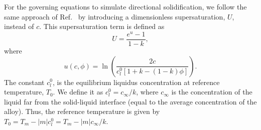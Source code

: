 \documentclass[10pt]{article}
\begin{document}
For the governing equations to simulate directional solidification, we follow the same approach of Ref.~\cite{Echebarria2004} by introducing a dimensionless supersaturation, $U$, instead of $c$. This supersaturation term is defined as
\begin{equation}
U = \frac{e^u -1}{1-k},
\end{equation}
where
\begin{equation}
\label{defu}
u(c,\phi) = \ln \left( \frac{2c}{c_l^0[1+k-(1-k)\phi]}\right).
\end{equation}
The constant $c_l^0$, is the equilibrium liquidus concentration at reference temperature, $T_0$. We define it as $c_l^0  = c_\infty /k$, where $c_\infty$ is the concentration of the liquid far from the solid-liquid interface (equal to the average concentration of the alloy). Thus, the reference temperature is given by  $T_0=T_m - |m|c_l^0 =T_m-|m|c_\infty/k$.
\end{document}
